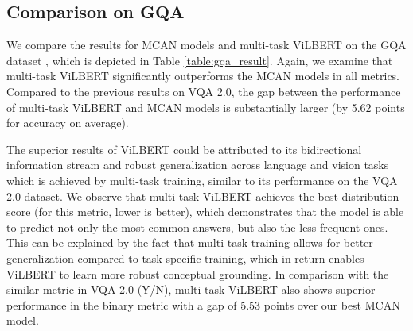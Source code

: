 \documentclass{article}
\begin{document}
\subsection{Comparison on GQA}
We compare the results for MCAN models and multi-task ViLBERT on the GQA dataset \citep{hudson2019gqa}, which is depicted in Table \ref{table:gqa_result}. Again, we examine that multi-task ViLBERT significantly outperforms the MCAN models in all metrics. Compared to the previous results on VQA 2.0, the gap between the performance of multi-task ViLBERT and MCAN models is substantially larger (by 5.62 points for accuracy on average).

The superior results of ViLBERT could be attributed to its bidirectional information stream and robust generalization across language and vision tasks which is achieved by multi-task training, similar to its performance on the VQA 2.0 dataset. We observe that multi-task ViLBERT achieves the best distribution score (for this metric, lower is better), which demonstrates that the model is able to predict not only the most common answers, but also the less frequent ones. This can be explained by the fact that multi-task training allows for better generalization compared to task-specific training, which in return enables ViLBERT to learn more robust conceptual grounding. In comparison with the similar metric in VQA 2.0 (Y/N), multi-task ViLBERT also shows superior performance in the binary metric with a gap of 5.53 points over our best MCAN model.

\end{document}
